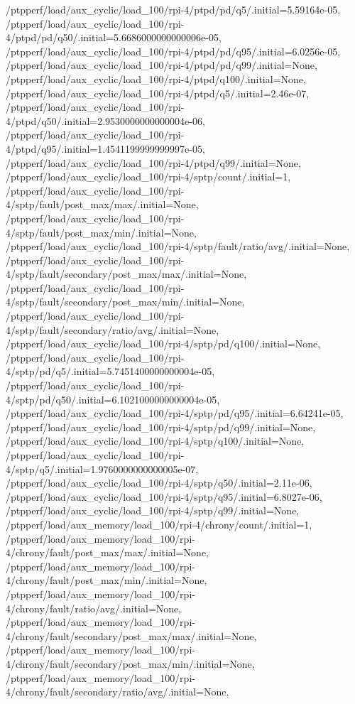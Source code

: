 {    /ptpperf/load/aux_cyclic/load_100/rpi-4/ptpd/pd/q5/.initial=5.59164e-05,
    /ptpperf/load/aux_cyclic/load_100/rpi-4/ptpd/pd/q50/.initial=5.6686000000000006e-05,
    /ptpperf/load/aux_cyclic/load_100/rpi-4/ptpd/pd/q95/.initial=6.0256e-05,
    /ptpperf/load/aux_cyclic/load_100/rpi-4/ptpd/pd/q99/.initial=None,
    /ptpperf/load/aux_cyclic/load_100/rpi-4/ptpd/q100/.initial=None,
    /ptpperf/load/aux_cyclic/load_100/rpi-4/ptpd/q5/.initial=2.46e-07,
    /ptpperf/load/aux_cyclic/load_100/rpi-4/ptpd/q50/.initial=2.9530000000000004e-06,
    /ptpperf/load/aux_cyclic/load_100/rpi-4/ptpd/q95/.initial=1.4541199999999997e-05,
    /ptpperf/load/aux_cyclic/load_100/rpi-4/ptpd/q99/.initial=None,
    /ptpperf/load/aux_cyclic/load_100/rpi-4/sptp/count/.initial=1,
    /ptpperf/load/aux_cyclic/load_100/rpi-4/sptp/fault/post_max/max/.initial=None,
    /ptpperf/load/aux_cyclic/load_100/rpi-4/sptp/fault/post_max/min/.initial=None,
    /ptpperf/load/aux_cyclic/load_100/rpi-4/sptp/fault/ratio/avg/.initial=None,
    /ptpperf/load/aux_cyclic/load_100/rpi-4/sptp/fault/secondary/post_max/max/.initial=None,
    /ptpperf/load/aux_cyclic/load_100/rpi-4/sptp/fault/secondary/post_max/min/.initial=None,
    /ptpperf/load/aux_cyclic/load_100/rpi-4/sptp/fault/secondary/ratio/avg/.initial=None,
    /ptpperf/load/aux_cyclic/load_100/rpi-4/sptp/pd/q100/.initial=None,
    /ptpperf/load/aux_cyclic/load_100/rpi-4/sptp/pd/q5/.initial=5.7451400000000004e-05,
    /ptpperf/load/aux_cyclic/load_100/rpi-4/sptp/pd/q50/.initial=6.1021000000000004e-05,
    /ptpperf/load/aux_cyclic/load_100/rpi-4/sptp/pd/q95/.initial=6.64241e-05,
    /ptpperf/load/aux_cyclic/load_100/rpi-4/sptp/pd/q99/.initial=None,
    /ptpperf/load/aux_cyclic/load_100/rpi-4/sptp/q100/.initial=None,
    /ptpperf/load/aux_cyclic/load_100/rpi-4/sptp/q5/.initial=1.9760000000000005e-07,
    /ptpperf/load/aux_cyclic/load_100/rpi-4/sptp/q50/.initial=2.11e-06,
    /ptpperf/load/aux_cyclic/load_100/rpi-4/sptp/q95/.initial=6.8027e-06,
    /ptpperf/load/aux_cyclic/load_100/rpi-4/sptp/q99/.initial=None,
    /ptpperf/load/aux_memory/load_100/rpi-4/chrony/count/.initial=1,
    /ptpperf/load/aux_memory/load_100/rpi-4/chrony/fault/post_max/max/.initial=None,
    /ptpperf/load/aux_memory/load_100/rpi-4/chrony/fault/post_max/min/.initial=None,
    /ptpperf/load/aux_memory/load_100/rpi-4/chrony/fault/ratio/avg/.initial=None,
    /ptpperf/load/aux_memory/load_100/rpi-4/chrony/fault/secondary/post_max/max/.initial=None,
    /ptpperf/load/aux_memory/load_100/rpi-4/chrony/fault/secondary/post_max/min/.initial=None,
    /ptpperf/load/aux_memory/load_100/rpi-4/chrony/fault/secondary/ratio/avg/.initial=None,
}
